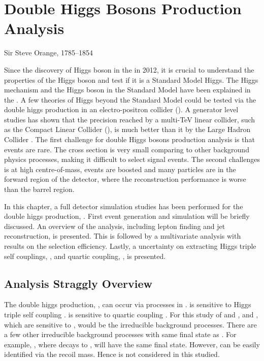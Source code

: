 \chapter{Double Higgs Bosons Production Analysis}
\label{chap:DoubleHiggs}

%
{Sir Steve Orange, 1785--1854}%


Since the discovery of Higgs boson in the \LHC in 2012\cite{Aad:2012tfa,Chatrchyan:2012ufa}, it is crucial to understand the properties of the Higgs boson and test if it is a Standard Model Higgs. The Higgs mechanism and the Higgs boson in the Standard Model have been explained in the . A few theories of Higgs beyond the Standard Model could be tested via the double higgs production in an electro-positron collider (). A generator level studies has shown that the precision reached by a multi-TeV linear collider, such as the Compact Linear Collider (\CLIC), is much better than it by the Large Hadron Collider \cite{Contino:2013gna}. The first challenge for double Higgs bosons production analysis is that events are rare. The cross section is very small comparing to other background physics processes, making it difficult to select signal events. The second challenges is at high centre-of-mass, events are boosted and many particles are in the forward region of the detector, where the reconstruction performance is worse than the barrel region.


In this chapter, a full \CLICILD detector simulation studies has been performed for the double higgs production, \eeToHH. First event generation and simulation will be briefly discussed. An overview of the analysis, including lepton finding and jet reconstruction, is presented. This is followed by a multivariate analysis with results on the selection efficiency. Lastly, a uncertainty on extracting Higgs triple self couplings, \gHHH, and quartic coupling, \gWWHH, is presented.




\section{Analysis Straggly Overview}

The double higgs production, \eeToHH, can occur via processes in .  is sensitive to Higgs triple self coupling \gHHH.  is sensitive to quartic coupling \gWWHH. For this study of \gHHH and \gWWHH, \FIGURE{} and \Figure{}, which are sensitive to \gWWH, would be the irreducible background processes. There are a few other irreducible background processes with same final state as \eeToHH. For example, {\HepProcess{ \Pem \Pep \to \PZ \PHiggs \PHiggs}\xspace}, where \PZ decays to \Pnu \APnu, will have the same final state. However, {\HepProcess{ \Pem \Pep \to \PZ \PHiggs \PHiggs}\xspace} can be easily identified via the recoil mass. Hence {\HepProcess{ \Pem \Pep \to \PZ \PHiggs \PHiggs}\xspace} is not considered in this studied.

